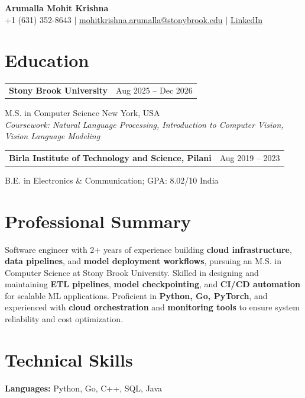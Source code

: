 \documentclass[letterpaper,10pt]{article}
\makeatletter
\newcommand{\entry}[2]{%
  \noindent
  \begin{tabularx}{\linewidth}
    {@{}>{\raggedright\arraybackslash}X@{\hspace{6pt}}r@{}}
    \textbf{#1} & #2
  \end{tabularx}\par
}
\makeatother
\begin{document}
\begin{center}
    {\LARGE\bfseries Arumalla Mohit Krishna}\\[3pt]
    +1 (631) 352-8643 $|$
    \href{mailto:mohitkrishna.arumalla@stonybrook.edu}
    {mohitkrishna.arumalla@stonybrook.edu} $|$
    \href{https://linkedin.com/in/mohit-krishna-arumalla}
    {LinkedIn}
\end{center}
\vspace{-8pt}

\section{Education}

\entry
  {\textbf{Stony Brook University}}
  {Aug 2025 -- Dec 2026}

M.S. in Computer Science \hfill New York, USA\\
\textit{
Coursework: Natural Language Processing,
Introduction to Computer Vision, Vision Language Modeling
}
\vspace{3pt}

\entry
  {\textbf{Birla Institute of Technology and Science, Pilani}}
  {Aug 2019 -- 2023}

B.E. in Electronics \& Communication; GPA: 8.02/10 \hfill India
\section{Professional Summary}

Software engineer with 2+ years of experience building \textbf{cloud infrastructure}, \textbf{data pipelines}, and \textbf{model deployment workflows}, pursuing an M.S. in Computer Science at Stony Brook University. Skilled in designing and maintaining \textbf{ETL pipelines}, \textbf{model checkpointing}, and \textbf{CI/CD automation} for scalable ML applications. Proficient in \textbf{Python, Go, PyTorch}, and experienced with \textbf{cloud orchestration} and \textbf{monitoring tools} to ensure system reliability and cost optimization.

\section{Technical Skills}

\textbf{Languages:}
Python, Go, C++, SQL, Java\\
\end{document}
